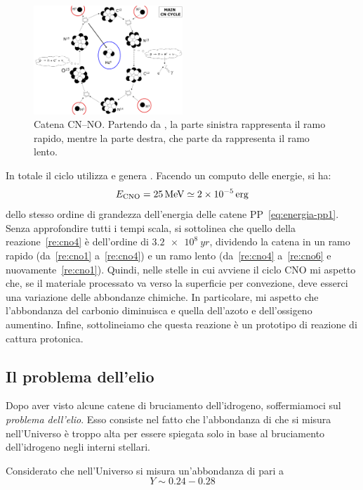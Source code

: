 \begin{figure}
    \centering
    \includegraphics[width=0.5\textwidth]{immagini/catena-cno.png}
    \caption{Catena CN--NO. Partendo da , la parte sinistra rappresenta il ramo rapido, mentre la parte destra, che parte da  rappresenta il ramo lento.}
    \label{fig:catena-cno}
\end{figure}

In totale il ciclo utilizza  e genera . Facendo un computo delle energie, si ha:
\begin{equation}\label{eq:energia-cno}
E_\textup{CNO} = \SI{25}{MeV} \simeq \SI{2e-5}{erg}
\end{equation}
dello stesso ordine di grandezza dell'energia delle catene PP~\eqref{eq:energia-pp1}. Senza approfondire tutti i tempi scala, si sottolinea che quello della reazione~\ref{re:cno4} è dell'ordine di $\SI{3.2e8}{yr}$, dividendo la catena in un ramo rapido (da~\ref{re:cno1} a~\ref{re:cno4}) e un ramo lento (da~\ref{re:cno4} a~\ref{re:cno6} e nuovamente~\ref{re:cno1}). Quindi, nelle stelle in cui avviene il ciclo CNO mi aspetto che, se il materiale processato va verso la superficie per convezione, deve esserci una variazione delle abbondanze chimiche. In particolare, mi aspetto che l'abbondanza del carbonio diminuisca e quella dell'azoto e dell'ossigeno aumentino. Infine, sottolineiamo che questa reazione è un prototipo di reazione di cattura protonica.

\subsection{Il problema dell'elio}
Dopo aver visto alcune catene di bruciamento dell'idrogeno, soffermiamoci sul \emph{problema dell'elio}. Esso consiste nel fatto che l'abbondanza di  che si misura nell'Universo è troppo alta per essere spiegata solo in base al bruciamento dell'idrogeno negli interni stellari.

Considerato che nell'Universo si misura un'abbondanza di  pari a
\begin{equation}\label{eq:abbondanza-elio-misurata}
    Y \sim 0.24 - 0.28
\end{equation}

